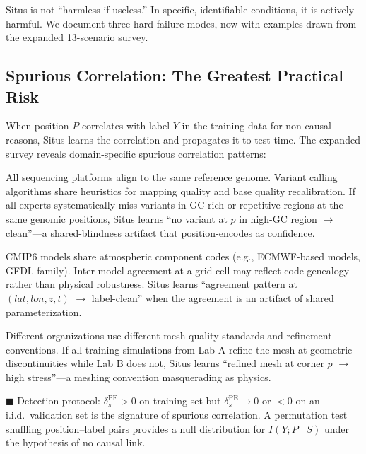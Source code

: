 \documentclass[12pt,a4paper]{article}
\begin{document}
Situs is not ``harmless if useless.'' In specific, identifiable conditions, it is actively harmful. We document three hard failure modes, now with examples drawn from the expanded 13-scenario survey.

\subsection{Spurious Correlation: The Greatest Practical Risk}
\label{sec:spurious}

When position $P$ correlates with label $Y$ in the training data for non-causal reasons, Situs learns the correlation and propagates it to test time. The expanded survey reveals domain-specific spurious correlation patterns:

\begin{description}[leftmargin=1.5cm]
\item[\textbf{Genomics — reference genome bias}.] All sequencing platforms align to the same reference genome. Variant calling algorithms share heuristics for mapping quality and base quality recalibration. If all experts systematically miss variants in GC-rich or repetitive regions at the same genomic positions, Situs learns ``no variant at $p$ in high-GC region $\to$ clean''—a shared-blindness artifact that position-encodes as confidence.
\item[\textbf{Climate — model genealogy confounding}.] CMIP6 models share atmospheric component codes (e.g., ECMWF-based models, GFDL family). Inter-model agreement at a grid cell may reflect code genealogy rather than physical robustness. Situs learns ``agreement pattern at $(lat,lon,z,t)$ $\to$ label-clean'' when the agreement is an artifact of shared parameterization.
\item[\textbf{Engineering — mesh convention artifact}.] Different organizations use different mesh-quality standards and refinement conventions. If all training simulations from Lab A refine the mesh at geometric discontinuities while Lab B does not, Situs learns ``refined mesh at corner $p$ $\to$ high stress''—a meshing convention masquerading as physics.
\end{description}

\textcolor{warning}{$\blacksquare$ Detection protocol}: $\delta_s^{\mathrm{PE}} > 0$ on training set but $\delta_s^{\mathrm{PE}} \to 0$ or $< 0$ on an i.i.d.\ validation set is the signature of spurious correlation. A permutation test shuffling position--label pairs provides a null distribution for $I(Y; P \mid S)$ under the hypothesis of no causal link.
\end{document}
